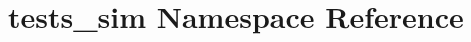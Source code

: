 \hypertarget{namespacetests__sim}{}\section{tests\+\_\+sim Namespace Reference}
\label{namespacetests__sim}
